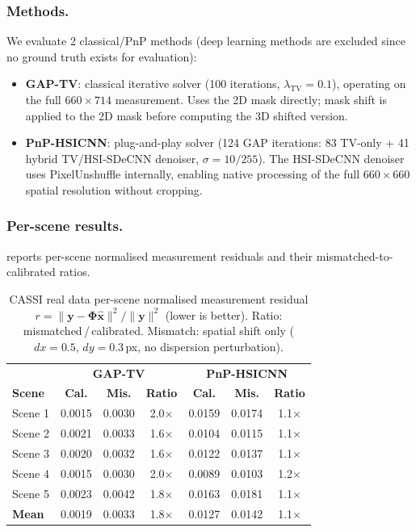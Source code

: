 \documentclass[runningheads]{llncs}
\begin{document}
\subsubsection{Methods.}
We evaluate 2 classical/PnP methods (deep learning methods are excluded since no ground truth exists for evaluation):
\begin{itemize}
    \item \textbf{GAP-TV}: classical iterative solver (100 iterations, $\lambda_{\text{TV}}{=}0.1$), operating on the full $660 \times 714$ measurement. Uses the 2D mask directly; mask shift is applied to the 2D mask before computing the 3D shifted version.
    \item \textbf{PnP-HSICNN}: plug-and-play solver (124 GAP iterations: 83 TV-only + 41 hybrid TV/HSI-SDeCNN denoiser, $\sigma{=}10/255$). The HSI-SDeCNN denoiser uses PixelUnshuffle internally, enabling native processing of the full $660 \times 660$ spatial resolution without cropping.
\end{itemize}

\subsubsection{Per-scene results.}
 reports per-scene normalised measurement residuals and their mismatched-to-calibrated ratios.

\begin{table}[h]
\centering
\caption{CASSI real data per-scene normalised measurement residual $r = \|\mathbf{y} - \mathbf{\Phi}\hat{\mathbf{x}}\|^2 / \|\mathbf{y}\|^2$ (lower is better). Ratio: mismatched\,/\,calibrated. Mismatch: spatial shift only ($dx{=}0.5$, $dy{=}0.3$\,px, no dispersion perturbation).}
\label{tab:cassi_real_perscene}
\begin{tabular}{@{}l|cc|c|cc|c@{}}
\toprule
& \multicolumn{3}{c|}{\textbf{GAP-TV}} & \multicolumn{3}{c}{\textbf{PnP-HSICNN}} \\
\textbf{Scene} & \textbf{Cal.} & \textbf{Mis.} & \textbf{Ratio} & \textbf{Cal.} & \textbf{Mis.} & \textbf{Ratio} \\
\midrule
Scene 1 & 0.0015 & 0.0030 & 2.0$\times$ & 0.0159 & 0.0174 & 1.1$\times$ \\
Scene 2 & 0.0021 & 0.0033 & 1.6$\times$ & 0.0104 & 0.0115 & 1.1$\times$ \\
Scene 3 & 0.0020 & 0.0032 & 1.6$\times$ & 0.0122 & 0.0137 & 1.1$\times$ \\
Scene 4 & 0.0015 & 0.0030 & 2.0$\times$ & 0.0089 & 0.0103 & 1.2$\times$ \\
Scene 5 & 0.0023 & 0.0042 & 1.8$\times$ & 0.0163 & 0.0181 & 1.1$\times$ \\
\midrule
\textbf{Mean} & 0.0019 & 0.0033 & 1.8$\times$ & 0.0127 & 0.0142 & 1.1$\times$ \\
\bottomrule
\end{tabular}
\end{table}
\end{document}
